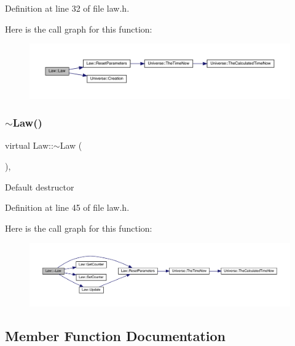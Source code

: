 Definition at line 32 of file law.\+h.

Here is the call graph for this function\+:
\nopagebreak
\begin{figure}[H]
\begin{center}
\leavevmode
\includegraphics[width=350pt]{class_law_aa4fb7baf54aa77720605fd601fb80b8d_cgraph}
\end{center}
\end{figure}
\mbox{\label{class_law_a4fa6f0fb61285152c8c6d7a17b51a82b}} 
\subsubsection{\texorpdfstring{$\sim$\+Law()}{~Law()}}
{\footnotesize\ttfamily virtual Law\+::$\sim$\+Law (\begin{DoxyParamCaption}{ }\end{DoxyParamCaption})\hspace{0.3cm}{\ttfamily [inline]}, {\ttfamily [virtual]}}

Default destructor 

Definition at line 45 of file law.\+h.

Here is the call graph for this function\+:
\nopagebreak
\begin{figure}[H]
\begin{center}
\leavevmode
\includegraphics[width=350pt]{class_law_a4fa6f0fb61285152c8c6d7a17b51a82b_cgraph}
\end{center}
\end{figure}


\subsection{Member Function Documentation}
\mbox{\label{class_law_a418791aee2a9204a99d3a917b86fafd3}} 
